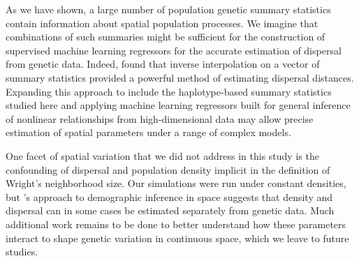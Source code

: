\documentclass[10pt,twoside,lineno,hidelinks]{preprint}
\begin{document}
As we have shown, a large number of population genetic summary statistics contain information about spatial population processes. We imagine that combinations of such summaries might be sufficient for the construction of supervised machine learning regressors \citep[e.g.,][]{Schrider2018} for the accurate estimation of dispersal from genetic data. Indeed, \citet{Ashander2018} found that inverse interpolation on a vector of summary statistics provided a powerful method of estimating dispersal distances. Expanding this approach to include the haplotype-based summary statistics studied here and applying machine learning regressors built for general inference of nonlinear relationships from high-dimensional data may allow precise estimation of spatial parameters under a range of complex models. 


One facet of spatial variation that we did not address in this study is the confounding of dispersal and population density implicit in the definition of Wright's neighborhood size. Our simulations were run under constant densities, but \citet{Ringbauer2017}'s approach to demographic inference in space suggests that density and dispersal can in some cases be estimated separately from genetic data. Much additional work remains to be done to better understand how these parameters interact to shape genetic variation in continuous space, which we leave to future studies. 
\end{document}
